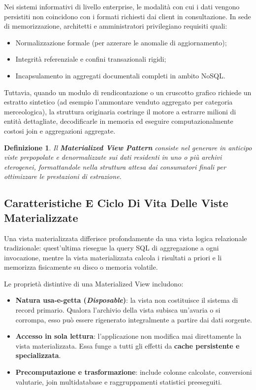 \documentclass[11pt, a4paper]{article}
\newtheorem{theorem}{Definizione}
\begin{document}
Nei sistemi informativi di livello enterprise, le modalità con cui i dati vengono persistiti non coincidono con i formati richiesti dai client in consultazione. In sede di memorizzazione, architetti e amministratori privilegiano requisiti quali:
\begin{itemize}[noitemsep]
    \item Normalizzazione formale (per azzerare le anomalie di aggiornamento);
    \item Integrità referenziale e confini transazionali rigidi;
    \item Incapsulamento in aggregati documentali completi in ambito NoSQL.
\end{itemize}
Tuttavia, quando un modulo di rendicontazione o un cruscotto grafico richiede un estratto sintetico (ad esempio l'ammontare venduto aggregato per categoria merceologica), la struttura originaria costringe il motore a estrarre milioni di entità dettagliate, decodificarle in memoria ed eseguire computazionalmente costosi join e aggregazioni aggregate.

\begin{theorem}
Il \textbf{Materialized View Pattern} consiste nel generare in anticipo viste prepopolate e denormalizzate sui dati residenti in uno o più archivi eterogenei, formattandole nella struttura attesa dai consumatori finali per ottimizzare le prestazioni di estrazione.
\end{theorem}

\subsection{Caratteristiche E Ciclo Di Vita Delle Viste Materializzate}

Una vista materializzata differisce profondamente da una vista logica relazionale tradizionale: quest'ultima riesegue la query SQL di aggregazione a ogni invocazione, mentre la vista materializzata calcola i risultati a priori e li memorizza fisicamente su disco o memoria volatile.


Le proprietà distintive di una Materialized View includono:
\begin{itemize}
    \item \textbf{Natura usa-e-getta (\emph{Disposable})}: la vista non costituisce il sistema di record primario. Qualora l'archivio della vista subisca un'avaria o si corrompa, esso può essere rigenerato integralmente a partire dai dati sorgente.
    \item \textbf{Accesso in sola lettura}: l'applicazione non modifica mai direttamente la vista materializzata. Essa funge a tutti gli effetti da \textbf{cache persistente e specializzata}.
    \item \textbf{Precomputazione e trasformazione}: include colonne calcolate, conversioni valutarie, join multidatabase e raggruppamenti statistici preeseguiti.
\end{itemize}
\end{document}
